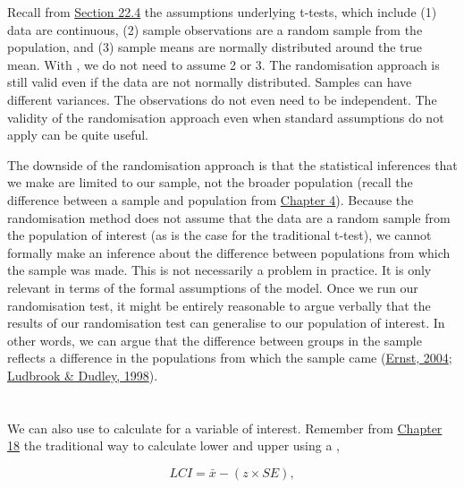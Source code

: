 \documentclass[
  openany]{krantz}
\begin{document}
Recall from \protect\hyperlink{assumptions-of-t-tests}{Section 22.4} the assumptions underlying t-tests, which include (1) data are continuous, (2) sample observations are a random sample from the population, and (3) sample means are normally distributed around the true mean.
With , we do not need to assume 2 or 3.
The randomisation approach is still valid even if the data are not normally distributed.
Samples can have different variances.
The observations do not even need to be independent.
The validity of the randomisation approach even when standard assumptions do not apply can be quite useful.

The downside of the randomisation approach is that the statistical inferences that we make are limited to our sample, not the broader population (recall the difference between a sample and population from \protect\hyperlink{Chapter_4}{Chapter 4}).
Because the randomisation method does not assume that the data are a random sample from the population of interest (as is the case for the traditional t-test), we cannot formally make an inference about the difference between populations from which the sample was made.
This is not necessarily a problem in practice.
It is only relevant in terms of the formal assumptions of the model.
Once we run our randomisation test, it might be entirely reasonable to argue verbally that the results of our randomisation test can generalise to our population of interest.
In other words, we can argue that the difference between groups in the sample reflects a difference in the populations from which the sample came (\protect\hyperlink{ref-Ernst2004}{Ernst, 2004}; \protect\hyperlink{ref-Ludbrook1998}{Ludbrook \& Dudley, 1998}).

\hypertarget{section-5}{%
\section{\texorpdfstring{}{}}\label{section-5}}

We can also use  to calculate  for a variable of interest. Remember from \protect\hyperlink{Chapter_18}{Chapter 18} the traditional way to calculate lower and upper  using a ,

\[LCI = \bar{x} - (z \times SE),\]
\end{document}
